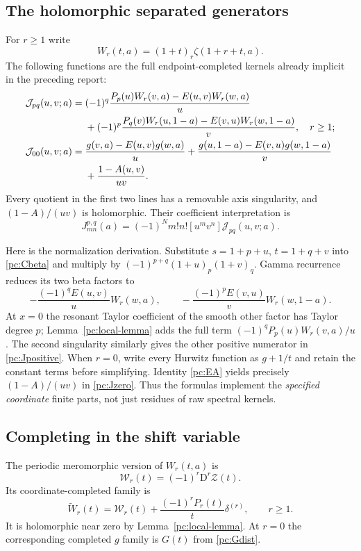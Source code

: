 \documentclass[11pt,a4paper]{article}
\numberwithin{equation}{section}
\theoremstyle{definition}
\newcommand{\D}{\mathrm D}
\newcommand{\CZ}{\mathscr Z}
\newcommand{\CJ}{\mathcal J}
\begin{document}
\subsection{The holomorphic separated generators}
For $r\ge1$ write
\begin{equation}\label{pc:Wr}
W_r(t,a)=(1+t)_r\zeta(1+r+t,a).
\end{equation}
The following functions are the full endpoint-completed kernels already implicit in the preceding report:
\begin{align}
\CJ_{pq}(u,v;a)={}&(-1)^q
\frac{P_p(u)W_r(v,a)-E(u,v)W_r(w,a)}u\notag\\
&+(-1)^p
\frac{P_q(v)W_r(u,1-a)-E(v,u)W_r(w,1-a)}v,
\quad r\ge1;\label{pc:Jpositive}\\
\CJ_{00}(u,v;a)={}&
\frac{g(v,a)-E(u,v)g(w,a)}u
+\frac{g(u,1-a)-E(v,u)g(w,1-a)}v\notag\\
&+\frac{1-A(u,v)}{uv}.\label{pc:Jzero}
\end{align}
Every quotient in the first two lines has a removable axis singularity, and $(1-A)/(uv)$ is holomorphic. Their coefficient interpretation is
\begin{equation}\label{pc:Jextract}
J_{mn}^{p,q}(a)=(-1)^N m!n![u^mv^n]\CJ_{pq}(u,v;a).
\end{equation}

Here is the normalization derivation. Substitute $s=1+p+u$, $t=1+q+v$ into \eqref{pc:Cbeta} and multiply by $(-1)^{p+q}(1+u)_p(1+v)_q$. Gamma recurrence reduces its two beta factors to
\[
-\frac{(-1)^qE(u,v)}uW_r(w,a),\qquad
-\frac{(-1)^pE(v,u)}vW_r(w,1-a).
\]
At $x=0$ the resonant Taylor coefficient of the smooth other factor has Taylor degree $p$; Lemma~\ref{pc:local-lemma} adds the full term
$(-1)^qP_p(u)W_r(v,a)/u$. The second singularity similarly gives the other positive numerator in \eqref{pc:Jpositive}. When $r=0$, write every Hurwitz function as $g+1/t$ and retain the constant terms before simplifying. Identity \eqref{pc:EA} yields precisely $(1-A)/(uv)$ in \eqref{pc:Jzero}. Thus the formulas implement the \emph{specified coordinate} finite parts, not just residues of raw spectral kernels.

\subsection{Completing in the shift variable}
The periodic meromorphic version of $W_r(t,a)$ is
\begin{equation}\label{pc:Wdist}
\mathscr W_r(t)=(-1)^r\D^r\CZ(t).
\end{equation}
Its coordinate-completed family is
\begin{equation}\label{pc:Wtilde}
\widetilde W_r(t)=\mathscr W_r(t)+\frac{(-1)^rP_r(t)}t\delta^{(r)},\qquad r\ge1.
\end{equation}
It is holomorphic near zero by Lemma~\ref{pc:local-lemma}. At $r=0$ the corresponding completed $g$ family is $G(t)$ from \eqref{pc:Gdist}.
\end{document}
